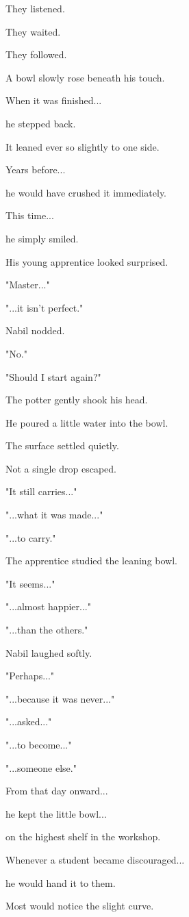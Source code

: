 \documentclass[12pt,openany]{book}
\begin{document}
They listened.

They waited.

They followed.

A bowl slowly rose beneath his touch.

When it was finished...

he stepped back.

It leaned ever so slightly to one side.

Years before...

he would have crushed it immediately.

This time...

he simply smiled.

His young apprentice looked surprised.

"Master..."

"...it isn't perfect."

Nabil nodded.

"No."

"Should I start again?"

The potter gently shook his head.

He poured a little water into the bowl.

The surface settled quietly.

Not a single drop escaped.

"It still carries..."

"...what it was made..."

"...to carry."

The apprentice studied the leaning bowl.

"It seems..."

"...almost happier..."

"...than the others."

Nabil laughed softly.

"Perhaps..."

"...because it was never..."

"...asked..."

"...to become..."

"...someone else."

From that day onward...

he kept the little bowl...

on the highest shelf in the workshop.

Whenever a student became discouraged...

he would hand it to them.

Most would notice the slight curve.
\end{document}

